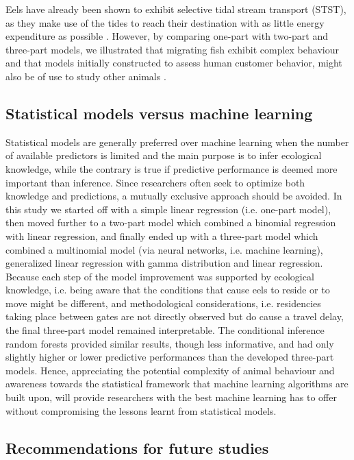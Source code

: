 \documentclass[preprint,12pt,authoryear]{elsarticle}
\begin{document}
Eels have already been shown to exhibit selective tidal stream transport (STST), as they make use of the tides to reach their destination with as little energy expenditure as possible \citep{Barry2016FreshwaterAnguilla,Verhelst2018}. However, by comparing one-part with two-part and three-part models, we illustrated that migrating fish exhibit complex behaviour and that models initially constructed to assess human customer behavior, might also be of use to study other animals \citep{Farewell2017Two-PartData}. 

\subsection{Statistical models versus machine learning}

Statistical models are generally preferred over machine learning when the number of available predictors is limited and the main purpose is to infer ecological knowledge, while the contrary is true if predictive performance is deemed more important than inference. Since researchers often seek to optimize both knowledge and predictions, a mutually exclusive approach should be avoided. In this study we started off with a simple linear regression (i.e. one-part model), then moved further to a two-part model which combined a binomial regression with linear regression, and finally ended up with a three-part model which combined a multinomial model (via neural networks, i.e. machine learning), generalized linear regression with gamma distribution and linear regression. Because each step of the model improvement was supported by ecological knowledge, i.e. being aware that the conditions that cause eels to reside or to move might be different, and methodological considerations, i.e. residencies taking place between gates are not directly observed but do cause a travel delay, the final three-part model remained interpretable. The conditional inference random forests provided similar results, though less informative, and had only slightly higher or lower predictive performances than the developed three-part models. Hence, appreciating the potential complexity of animal behaviour and awareness towards the statistical framework that machine learning algorithms are built upon, will provide researchers with the best machine learning has to offer without compromising the lessons learnt from statistical models. 

\subsection{Recommendations for future studies}
\end{document}
